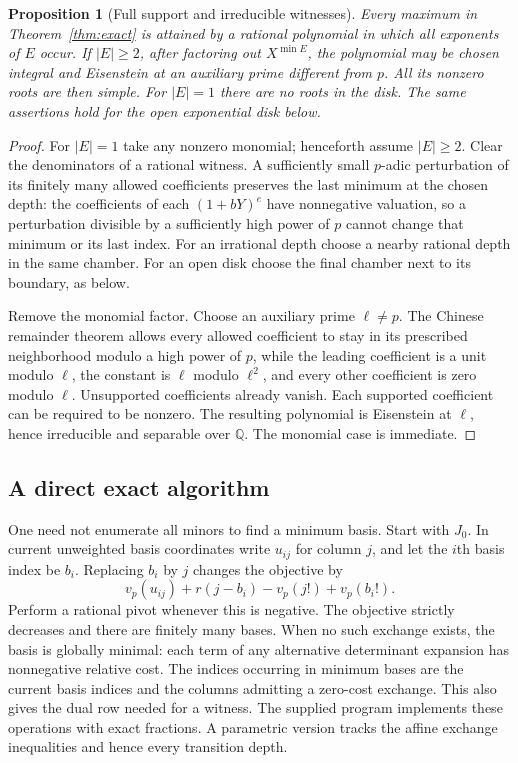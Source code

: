 \documentclass[11pt,letterpaper]{article}
\newtheorem{proposition}[theorem]{Proposition}
\theoremstyle{definition}\newtheorem{definition}[theorem]{Definition}
\theoremstyle{remark}\newtheorem{remark}[theorem]{Remark}
\newcommand{\Q}{\mathbb Q}
\newcommand{\vp}{v_p}
\begin{document}
\begin{proposition}[Full support and irreducible witnesses]\label{prop:witness}
Every maximum in Theorem~\ref{thm:exact} is attained by a rational
polynomial in which all exponents of $E$ occur. If $|E|\ge2$, after
factoring out $X^{\min E}$, the polynomial may be chosen integral and
Eisenstein at an auxiliary prime different from $p$. All its nonzero
roots are then simple. For $|E|=1$ there are no roots in the disk.
The same assertions hold for the open exponential disk below.
\end{proposition}

\begin{proof}
For $|E|=1$ take any nonzero monomial; henceforth assume $|E|\ge2$.
Clear the denominators of a rational witness. A sufficiently small
$p$-adic perturbation of its finitely many allowed coefficients
preserves the last minimum at the chosen depth: the coefficients of
each $(1+bY)^e$ have nonnegative valuation, so a perturbation divisible
by a sufficiently high power of $p$ cannot change that minimum or its
last index. For an irrational depth choose a nearby rational depth in
the same chamber. For an open disk choose the final chamber next to
its boundary, as below.

Remove the monomial factor. Choose an auxiliary prime $\ell\ne p$.
The Chinese remainder theorem allows every allowed coefficient to
stay in its prescribed neighborhood modulo a high power of $p$,
while the leading coefficient is a unit modulo $\ell$, the constant
is $\ell$ modulo $\ell^2$, and every other coefficient is zero modulo
$\ell$. Unsupported coefficients already vanish. Each supported
coefficient can be required to be nonzero. The resulting polynomial
is Eisenstein at $\ell$, hence irreducible and separable over $\Q$.
The monomial case is immediate.
\end{proof}

\subsection{A direct exact algorithm}
One need not enumerate all minors to find a minimum basis. Start with
$J_0$. In current unweighted basis coordinates write $u_{ij}$ for
column $j$, and let the $i$th basis index be $b_i$. Replacing $b_i$ by
$j$ changes the objective by
\[
 \vp(u_{ij})+r(j-b_i)-\vp(j!)+\vp(b_i!).
\]
Perform a rational pivot whenever this is negative. The objective
strictly decreases and there are finitely many bases. When no such
exchange exists, the basis is globally minimal: each term of any
alternative determinant expansion has nonnegative relative cost.
The indices occurring in minimum bases are the current basis indices
and the columns admitting a zero-cost exchange. This also gives the
dual row needed for a witness. The supplied program implements these
operations with exact fractions. A parametric version tracks the
affine exchange inequalities and hence every transition depth.
\end{document}

